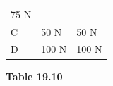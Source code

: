 \begin{enumerate}[noitemsep, label=\textbf{\arabic*}. ]
{{\begin{center}
\begin{xtabular}[t]{|l|l|l|}
        75 N%
     \tabularnewline{}
    
    
        C &
    
    
        50 N &
    
    
        50 N%
     \tabularnewline{}
    
    
        D &
    
    
        100 N &
    
    
        100 N%
     \tabularnewline{}
    \end{xtabular}
      \end{center}
    \begin{center}{\small\bfseries Table 19.10}\end{center}
    
}}
\end{enumerate}
